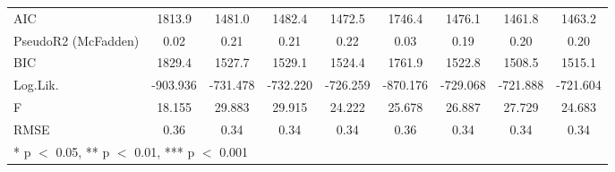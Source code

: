 \begin{table}
\begin{tabular}[t]{lcccccccc}
AIC & 1813.9 & 1481.0 & 1482.4 & 1472.5 & 1746.4 & 1476.1 & 1461.8 & 1463.2\\
PseudoR2 (McFadden) & 0.02 & 0.21 & 0.21 & 0.22 & 0.03 & 0.19 & 0.20 & 0.20\\
BIC & 1829.4 & 1527.7 & 1529.1 & 1524.4 & 1761.9 & 1522.8 & 1508.5 & 1515.1\\
Log.Lik. & -903.936 & -731.478 & -732.220 & -726.259 & -870.176 & -729.068 & -721.888 & -721.604\\
F & 18.155 & 29.883 & 29.915 & 24.222 & 25.678 & 26.887 & 27.729 & 24.683\\
RMSE & 0.36 & 0.34 & 0.34 & 0.34 & 0.36 & 0.34 & 0.34 & 0.34\\
\bottomrule
\multicolumn{9}{l}{\rule{0pt}{1em}* p $<$ 0.05, ** p $<$ 0.01, *** p $<$ 0.001}\\
\end{tabular}
\end{table}
